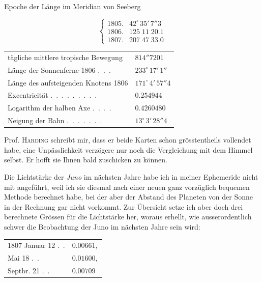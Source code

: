 \begin{center}
Epoche der Länge im Meridian von Seeberg
\end{center}
\[
\left\{\begin{array}{ll}
1805. & 42^\circ\,35'\,7''3\\
1806. & 125\;11\;20.1\\
1807. & 207\;47\;33.0
\end{array}\right.
\]
\begin{center}\begingroup
\fontsize{9}{11}\selectfont
\setlength{\tabcolsep}{3pt}\renewcommand{\arraystretch}{1.12}
\begin{tabular}{ll}
tägliche mittlere tropische Bewegung  & $814''7201$ \\
Länge der Sonnenferne 1806 .\ .\ . & $233^\circ\,17'\,1''$ \\
Länge des aufsteigenden Knotens 1806  & $171^\circ\,4'\,57''4$ \\
Excentricität .\ .\ .\ .\ .\ .\ .\ .\ . & $0.254944$ \\
Logarithm der halben Axe .\ .\ .\ . & $0.4260480$ \\
Neigung der Bahn .\ .\ .\ .\ .\ .\ . & $13^\circ\,3'\,28''4$ \\
\end{tabular}\endgroup\end{center}

\par\indent Prof. \textsc{Harding} schreibt mir, dass er beide Karten schon grösstentheils vollendet habe, eine Unpässlichkeit verzögere nur noch die Vergleichung mit dem Himmel selbst. Er hofft sie Ihnen bald zuschicken zu können.

\par\indent Die Lichtstärke der \emph{Juno} im nächsten Jahre habe ich in meiner Ephemeride nicht mit angeführt,
weil ich sie diesmal nach einer neuen ganz vorzüglich bequemen Methode berechnet habe, bei der aber
der Abstand des Planeten von der Sonne in der Rechnung gar nicht vorkommt. Zur Übersicht setze ich
aber doch drei berechnete Grössen für die Lichtstärke her, woraus erhellt, wie ausserordentlich schwer
die Beobachtung der Juno im nächsten Jahre sein wird:

\begin{center}\begingroup
\fontsize{9}{11}\selectfont
\setlength{\tabcolsep}{3pt}\renewcommand{\arraystretch}{1.12}
\begin{tabular}{ll}
1807 Januar 12 .\ . & $0.00661,$ \\
Mai 18 .\ . & $0.01600,$ \\
Septbr. 21 .\ . & $0.00709$ \\
\end{tabular}\endgroup\end{center}

